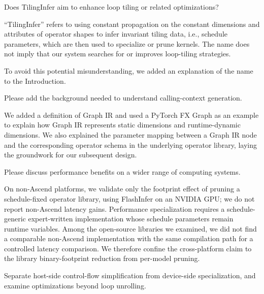 
{Does TilingInfer aim to enhance loop tiling or related optimizations?}

\authorresponse
``TilingInfer'' refers to using constant propagation on the constant dimensions
and attributes of operator shapes to infer invariant tiling data, i.e.,
schedule parameters, which are then used to specialize or prune kernels.  The
name does not imply that our system searches for or improves loop-tiling
strategies.

To avoid this potential misunderstanding, we added an explanation of the name
to the Introduction.


{Please add the background needed to understand calling-context generation.}

\authorresponse
We added a definition of Graph IR and used a PyTorch FX Graph as an example to
explain how Graph IR represents static dimensions and runtime-dynamic
dimensions.  We also explained the parameter mapping between a Graph IR node
and the corresponding operator schema in the underlying operator library,
laying the groundwork for our subsequent design.


{Please discuss performance benefits on a wider range of computing systems.}

\authorresponse
On non-Ascend platforms, we validate only the footprint effect of pruning a
schedule-fixed operator library, using FlashInfer on an NVIDIA GPU; we do not
report non-Ascend latency gains.  Performance specialization requires a
schedule-generic expert-written implementation whose schedule parameters remain
runtime variables.  Among the open-source libraries we examined, we did not
find a comparable non-Ascend implementation with the same compilation path for
a controlled latency comparison.  We therefore confine the cross-platform
claim to the library binary-footprint reduction from per-model pruning.


{Separate host-side control-flow simplification from device-side
specialization, and examine optimizations beyond loop unrolling.}

